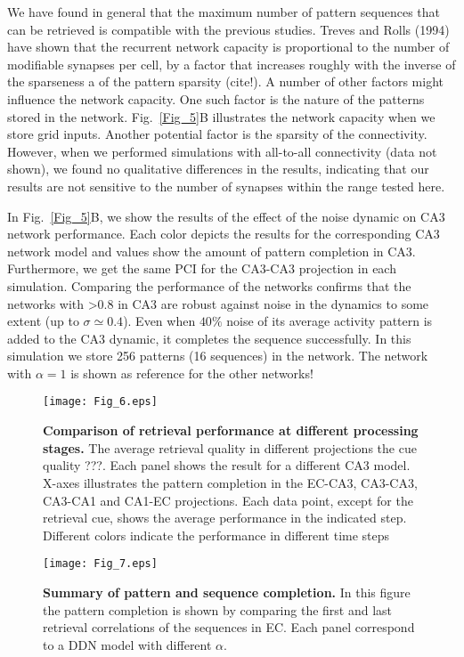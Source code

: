 \documentclass[utf8]{frontiersSCNS} %
\begin{document}
We have found in general that the maximum number of pattern sequences that can be retrieved is compatible with the previous studies. Treves and Rolls (1994) have shown that the recurrent network capacity is proportional to the number of modifiable synapses per cell, by a factor that increases roughly with the inverse of the sparseness a of the pattern sparsity (cite!).
A number of other factors might influence the network capacity. One such factor is the nature of the patterns stored in the network. Fig.~\ref{Fig_5}B illustrates the network capacity when we store grid inputs. 
Another potential factor is the sparsity of the connectivity. However, when we performed simulations with all-to-all connectivity (data not shown), we found no qualitative differences in the results, indicating that our results are not sensitive to the number of synapses within the range tested here. 

In Fig.~\ref{Fig_5}B, we show the results of the effect of the noise dynamic on CA3 network performance. Each color depicts the results for the corresponding CA3 network model and values show the amount of pattern completion in CA3.
Furthermore, we get the same PCI for the CA3-CA3 projection in each simulation.
Comparing the performance of the networks confirms that the networks with >0.8 in CA3 are robust against noise in the dynamics to some extent (up to $\sigma \simeq 0.4$). Even when $ 40 \% $ noise of its average activity pattern is added to the CA3 dynamic, it completes the sequence successfully. In this simulation we store 256 patterns (16 sequences) in the network. The network with $\alpha = 1$ is shown as reference for the other networks!    


\begin{figure}[!htb]
\centering\texttt{[image: Fig\_6.eps]}
\caption{\textbf{Comparison of retrieval performance at different processing stages.}
The average retrieval quality in different projections the cue quality ???. Each panel shows the result for a different CA3 model. X-axes illustrates the pattern completion in the EC-CA3, CA3-CA3, CA3-CA1 and CA1-EC projections. Each data point, except for the retrieval cue, shows the average performance in the indicated step. Different colors indicate the performance in different time steps}
\label{Fig_6}
\end{figure}



\begin{figure}[!htb]
\centering\texttt{[image: Fig\_7.eps]}
\caption{\textbf{Summary of pattern and sequence completion.} In this figure the pattern completion is shown by comparing the first and last retrieval correlations of the sequences in EC. Each panel correspond to a  DDN model with different $\alpha$.}
\label{Fig_7}
\end{figure}
\end{document}
